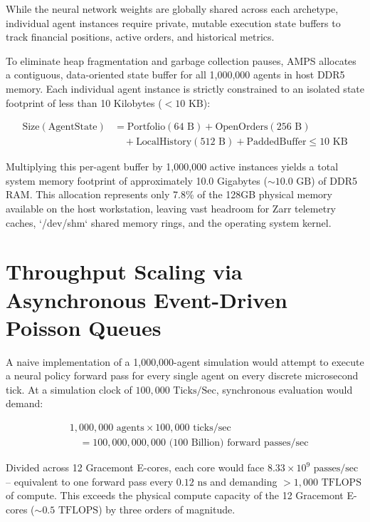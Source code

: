 While the neural network weights are globally shared across each archetype, individual agent instances require private, mutable execution state buffers to track financial positions, active orders, and historical metrics.

To eliminate heap fragmentation and garbage collection pauses, AMPS allocates a contiguous, data-oriented state buffer for all 1,000,000 agents in host DDR5 memory. Each individual agent instance is strictly constrained to an isolated state footprint of less than 10 Kilobytes ($<10\text{ KB}$):

\begin{equation}
\begin{split}
    \text{Size}(\text{AgentState}) &= \text{Portfolio} (64\text{ B}) + \text{OpenOrders} (256\text{ B}) \\
    &\quad + \text{LocalHistory} (512\text{ B}) + \text{PaddedBuffer} \le 10\text{ KB}
\end{split}
\end{equation}

Multiplying this per-agent buffer by 1,000,000 active instances yields a total system memory footprint of approximately 10.0 Gigabytes ($\sim 10.0\text{ GB}$) of DDR5 RAM. This allocation represents only 7.8\% of the 128GB physical memory available on the host workstation, leaving vast headroom for Zarr telemetry caches, `/dev/shm` shared memory rings, and the operating system kernel.

\section{Throughput Scaling via Asynchronous Event-Driven Poisson Queues}

A naive implementation of a 1,000,000-agent simulation would attempt to execute a neural policy forward pass for every single agent on every discrete microsecond tick. At a simulation clock of $100,000\text{ Ticks/Sec}$, synchronous evaluation would demand:

\begin{equation}
\begin{split}
    &1,000,000\text{ agents} \times 100,000\text{ ticks/sec} \\
    &\quad = 100,000,000,000\text{ (100 Billion) forward passes/sec}
\end{split}
\end{equation}

Divided across 12 Gracemont E-cores, each core would face $8.33\times 10^9\text{ passes/sec}$ -- equivalent to one forward pass every $0.12\text{ ns}$ and demanding $>1,000\text{ TFLOPS}$ of compute. This exceeds the physical compute capacity of the 12 Gracemont E-cores ($\sim 0.5\text{ TFLOPS}$) by three orders of magnitude.

